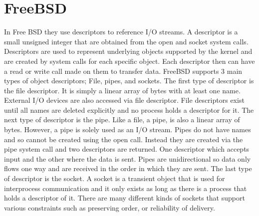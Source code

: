 \documentclass[letterpaper, 10pt, draftclsnofoot,onecolumn]{article}
\begin{document}
\section{FreeBSD}
In Free BSD they use descriptors to reference I/O streams. A descriptor is a small unsigned integer that are obtained from the open and socket system calls. Descriptors are used to represent underlying objects supported by the kernel and are created by system calls for each specific object. Each descriptor then can have a read or write call made on them to transfer data. FreeBSD supports 3 main types of object descriptors; File, pipes, and sockets.
\newline
The first type of descriptor is the file descriptor. It is simply a linear array of bytes with at least one name. External I/O devices are also accessed via file descriptor. File descriptors exist until all names are deleted explicitly and no process holds a descriptor for it. 
\newline
The next type of descriptor is the pipe. Like a file, a pipe, is also a linear array of bytes. However, a pipe is solely used as an I/O stream. Pipes do not have names and so cannot be created using the open call. Instead they are created via the pipe system call and two descriptors are returned. One descriptor which accepts input and the other where the data is sent. Pipes are unidirectional so data only flows one way and are received in the order in which they are sent.
\newline
The last type of descriptor is the socket. A socket is a transient object that is used for interprocess communication and it only exists as long as there is a process that holds a descriptor of it. There are many different kinds of sockets that support various constraints such as preserving order, or reliability of delivery.
\newline
\newline
\end{document}
